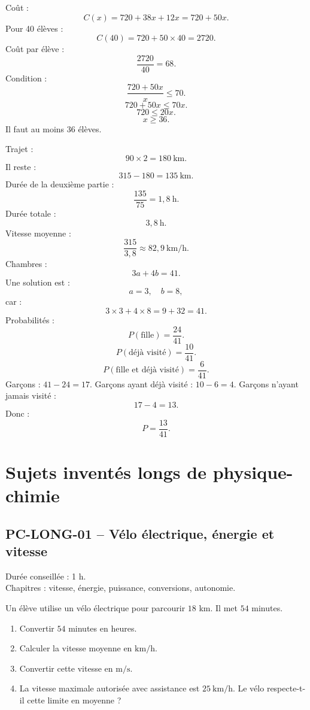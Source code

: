 \begin{correction}
Coût :
\[
C(x)=720+38x+12x=720+50x.
\]
Pour 40 élèves :
\[
C(40)=720+50\times40=2720.
\]
Coût par élève :
\[
\frac{2720}{40}=68.
\]
Condition :
\[
\frac{720+50x}{x}\leq70.
\]
\[
720+50x\leq70x.
\]
\[
720\leq20x.
\]
\[
x\geq36.
\]
Il faut au moins 36 élèves.

Trajet :
\[
90\times2=180\ \mathrm{km}.
\]
Il reste :
\[
315-180=135\ \mathrm{km}.
\]
Durée de la deuxième partie :
\[
\frac{135}{75}=1{,}8\ \mathrm{h}.
\]
Durée totale :
\[
3{,}8\ \mathrm{h}.
\]
Vitesse moyenne :
\[
\frac{315}{3{,}8}\approx82{,}9\ \mathrm{km/h}.
\]
Chambres :
\[
3a+4b=41.
\]
Une solution est :
\[
a=3,\quad b=8,
\]
car :
\[
3\times3+4\times8=9+32=41.
\]
Probabilités :
\[
P(\text{fille})=\frac{24}{41}.
\]
\[
P(\text{déjà visité})=\frac{10}{41}.
\]
\[
P(\text{fille et déjà visité})=\frac{6}{41}.
\]
Garçons : $41-24=17$. Garçons ayant déjà visité : $10-6=4$. Garçons n'ayant jamais visité :
\[
17-4=13.
\]
Donc :
\[
P=\frac{13}{41}.
\]
\end{correction}

\newpage

\section{Sujets inventés longs de physique-chimie}

\subsection{PC-LONG-01 -- Vélo électrique, énergie et vitesse}

\begin{objectif}
Durée conseillée : 1 h.\\
Chapitres : vitesse, énergie, puissance, conversions, autonomie.
\end{objectif}

\begin{exercice}
Un élève utilise un vélo électrique pour parcourir $18$ km. Il met $54$ minutes.

\begin{enumerate}
  \item Convertir $54$ minutes en heures.
  \item Calculer la vitesse moyenne en $\mathrm{km/h}$.
  \item Convertir cette vitesse en $\mathrm{m/s}$.
  \item La vitesse maximale autorisée avec assistance est $25\ \mathrm{km/h}$. Le vélo respecte-t-il cette limite en moyenne ?
\end{enumerate}
\end{exercice}

